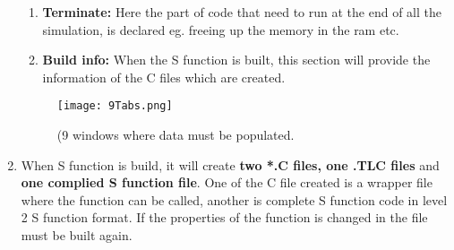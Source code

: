 \documentclass{article}
\begin{document}
\begin{enumerate}
\begin{enumerate}
        \item \textbf{Terminate:} Here the part of code that need to run at the end of all the simulation, is declared eg. freeing up the memory in the ram etc.
        \item  \textbf{Build info:} When the S function is built, this section will provide the information of the C files which are created. 
    \end{enumerate}
    \begin{figure}[H]
        \centering
        \texttt{[image: 9Tabs.png]}
        \caption{(9 windows where data must be populated.}
        \label{fig:my_label}
    \end{figure}
\item When S function is build, it will create\textbf{ two *.C files, one .TLC files} and \textbf{one complied S function file}. One of the C file created is a wrapper file where the function can be called, another  is complete S function code in level 2 S function format. If the properties of the function is changed in the file must be built again.
\end{enumerate}
\end{document}
